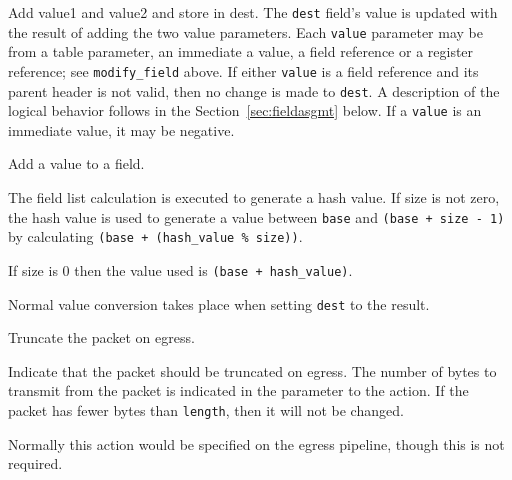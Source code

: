 \documentclass[12pt]{article}
\begin{document}

{ %
Add value1 and value2 and store in dest.
}
{ %
}
{ %
The \texttt{dest} field's value is updated with the result of adding
the two value parameters. Each \texttt{value} parameter may be from a
table parameter, an immediate a value, a field reference or a register
reference; see \texttt{modify_field} above.  If either \texttt{value}
is a field reference and its parent header is not valid, then no
change is made to \texttt{dest}.  A description of the logical
behavior follows in the Section~\ref{sec:fieldasgmt} below.  If a
\texttt{value} is an immediate value, it may be negative.
}


{ %
Add a value to a field.
}
{ %
}
{ %
The field list calculation is executed to generate a hash value.  If size 
is not zero, the hash value is used to generate a value between \texttt{base} and 
\texttt{(base + size - 1)} by calculating \texttt{(base + (hash_value \% size))}.  

If size is 0 then the value used is \texttt{(base + hash_value)}.

Normal value conversion takes place when setting \texttt{dest} to the result.
}


{ %
Truncate the packet on egress.
}
{ %
}
{ %
Indicate that the packet should be truncated on egress.  The number of bytes 
to transmit from the packet is indicated in the parameter to the action.  If 
the packet has fewer bytes than \texttt{length}, then it will not be changed.

Normally this action would be specified on the egress pipeline, though this 
is not required.
}
\end{document}
